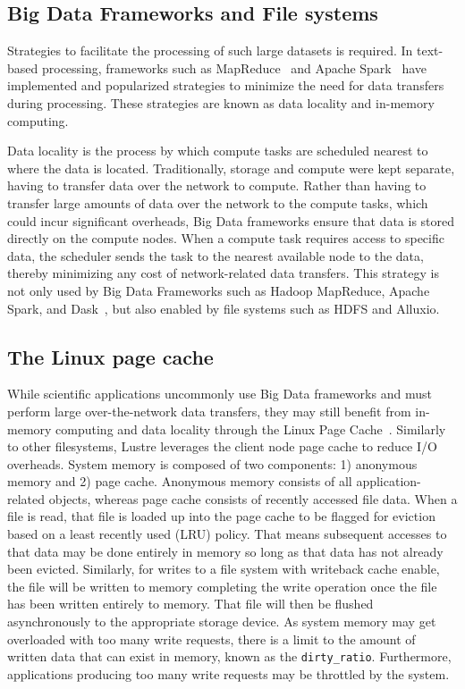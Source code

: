 \subsection{Big Data Frameworks and File systems}

      Strategies to facilitate the processing of such large datasets is
      required. In text-based processing, frameworks such as
      MapReduce~\cite{dean2008mapreduce} and Apache Spark~\cite{zaharia2016apache} have implemented
      and popularized strategies to minimize the need for data transfers during
      processing. These strategies are known as data locality and in-memory
      computing.

      Data locality is the process by which compute tasks are scheduled nearest
      to where the data is located. Traditionally, storage and compute were kept
      separate, having to transfer data over the network to compute. Rather than
      having to transfer large amounts of data over the network to the compute
      tasks, which could incur significant overheads, Big Data frameworks ensure
      that data is stored directly on the compute nodes. When a compute task
      requires access to specific data, the scheduler sends the task to the
      nearest available node to the data, thereby minimizing any cost of
      network-related data transfers. This strategy is not only used by Big Data
      Frameworks such as Hadoop MapReduce, Apache Spark, and Dask~\cite{rocklin2015dask},
      but also enabled by file systems such as HDFS and Alluxio.



\subsection{The Linux page cache}
 While scientific applications uncommonly use Big Data frameworks and must
      perform large over-the-network data transfers, they may still benefit from
      in-memory computing and data locality through the Linux Page
      Cache~\cite{pagecache}. Similarly to other filesystems, Lustre leverages
      the client node page cache to reduce I/O overheads. System memory is
      composed of two components: 1) anonymous memory and 2) page cache.
      Anonymous memory consists of all application-related objects, whereas page
      cache consists of recently accessed file data. When a file is read, that
      file is loaded up into the page cache to be flagged for eviction based on
      a least recently used (LRU) policy. That means subsequent accesses to that
      data may be done entirely in memory so long as that data has not already
      been evicted. Similarly, for writes to a file system with writeback cache
      enable, the file will be written to memory completing the write operation
      once the file has been written entirely to memory. That file will then be
      flushed asynchronously to the appropriate storage device. As system memory
      may get overloaded with too many write requests, there is a limit to the
      amount of written data that can exist in memory, known as the
      \texttt{dirty\_ratio}. Furthermore, applications producing too many write
      requests may be throttled by the system.

